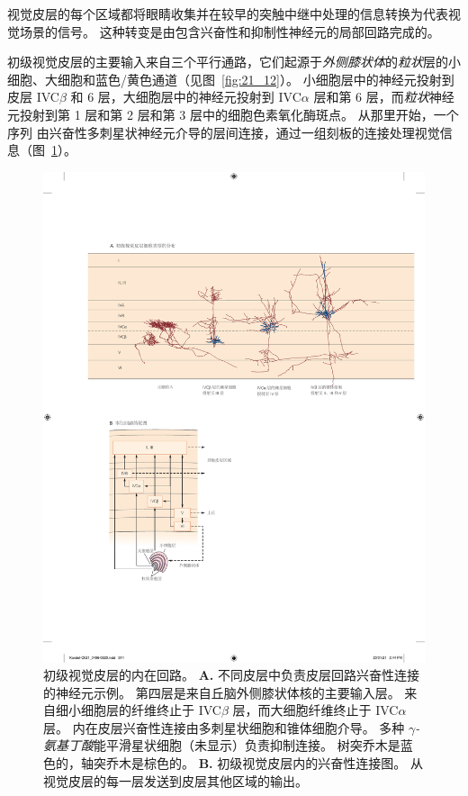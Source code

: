 视觉皮层的每个区域都将眼睛收集并在较早的突触中继中处理的信息转换为代表视觉场景的信号。
这种转变是由包含兴奋性和抑制性神经元的局部回路完成的。


初级视觉皮层的主要输入来自三个平行通路，它们起源于\textit{外侧膝状体}的\textit{粒状}层的小细胞、大细胞和蓝色/黄色通道（见图~\ref{fig:21_12}）。
小细胞层中的神经元投射到皮层 IVC$\beta$ 和 6 层，大细胞层中的神经元投射到 IVC$\alpha$ 层和第 6 层，而\textit{粒状}神经元投射到第 1 层和第 2 层和第 3 层中的细胞色素氧化酶斑点。
从那里开始，一个序列 由兴奋性多刺星状神经元介导的层间连接，通过一组刻板的连接处理视觉信息（图~\ref{fig:21_15}）。


\begin{figure}[htbp]
	\centering
	\includegraphics[width=1.0\linewidth]{chap21/fig_21_15}
	\caption{初级视觉皮层的内在回路。
		\textbf{A.} 不同皮层中负责皮层回路兴奋性连接的神经元示例。 
		第四层是来自丘脑外侧膝状体核的主要输入层。 
		来自细小细胞层的纤维终止于 IVC$\beta$ 层，而大细胞纤维终止于 IVC$\alpha$ 层。 
		内在皮层兴奋性连接由多刺星状细胞和锥体细胞介导。 
		多种 \textit{$\gamma$-氨基丁酸}能平滑星状细胞（未显示）负责抑制连接。 
		树突乔木是蓝色的，轴突乔木是棕色的\cite{blasdel1983termination}。
		\textbf{B.} 初级视觉皮层内的兴奋性连接图。
		从视觉皮层的每一层发送到皮层其他区域的输出。}
	\label{fig:21_15}
\end{figure}



